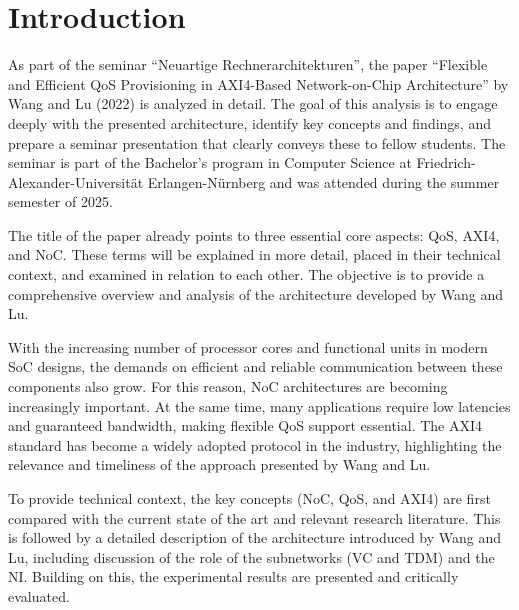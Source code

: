 \chapter{Introduction}

As part of the seminar “Neuartige Rechnerarchitekturen”, the paper “Flexible and Efficient QoS Provisioning in AXI4-Based Network-on-Chip Architecture” by Wang and Lu (2022) is analyzed in detail.\cite{wang_flexible_2022} The goal of this analysis is to engage deeply with the presented architecture, identify key concepts and findings, and prepare a seminar presentation that clearly conveys these to fellow students.
The seminar is part of the Bachelor's program in Computer Science at Friedrich-Alexander-Universität Erlangen-Nürnberg and was attended during the summer semester of 2025.

The title of the paper already points to three essential core aspects: \ac{QoS}, \ac{AXI4}, and \ac{NoC}. These terms will be explained in more detail, placed in their technical context, and examined in relation to each other. The objective is to provide a comprehensive overview and analysis of the architecture developed by Wang and Lu.

With the increasing number of processor cores and functional units in modern \ac{SoC} designs, the demands on efficient and reliable communication between these components also grow. For this reason, NoC architectures are becoming increasingly important. At the same time, many applications require low latencies and guaranteed bandwidth, making flexible QoS support essential. The AXI4 standard has become a widely adopted protocol in the industry, highlighting the relevance and timeliness of the approach presented by Wang and Lu.\cite{jake_ke_demystifying_2025}\cite{gomez-rodriguez_survey_2021}\cite{talwar_traffic_2013}

To provide technical context, the key concepts (NoC, QoS, and AXI4) are first compared with the current state of the art and relevant research literature. This is followed by a detailed description of the architecture introduced by Wang and Lu, including discussion of the role of the subnetworks (\ac{VC} and \ac{TDM}) and the \ac{NI}. Building on this, the experimental results are presented and critically evaluated.
